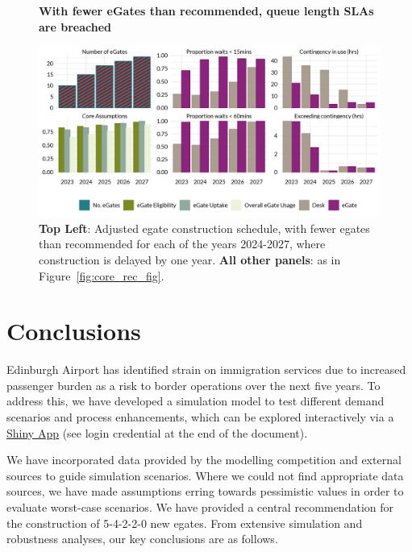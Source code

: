 \documentclass[10pt]{article}
\newcommand*{\figuretitle}[1]{%
    {\centering%
    \textbf{#1}%
    \par\medskip}%
}
\begin{document}
\begin{figure}[!t]
    \centering
    \figuretitle{With fewer eGates than recommended, queue length SLAs are breached}
    \includegraphics[width=\textwidth]{figures/minus_core_rec_fig.png}
     \caption{\textbf{Top Left}: Adjusted \gls{egate} construction schedule, with fewer \glspl{egate} than recommended for each of the years 2024-2027, where construction is delayed by one year. \textbf{All other panels}: as in Figure~\ref{fig:core_rec_fig}.} \label{fig:minus_core_rec_fig}
\end{figure}




\section{Conclusions}
Edinburgh Airport has identified strain on immigration services due to increased passenger burden as a risk to border operations over the next five years. To address this, we have developed a simulation model to test different demand scenarios and process enhancements, which can be explored interactively via a \href{https://jacob-bradley.shinyapps.io/shiny/}{Shiny App} (see login credential at the end of the document). 

We have incorporated data provided by the modelling competition and external sources to guide simulation scenarios. Where we could not find appropriate data sources, we have made assumptions erring towards pessimistic values in order to evaluate worst-case scenarios. We have provided a central recommendation for the construction of 5-4-2-2-0 new \glspl{egate}. From extensive simulation and robustness analyses, our key conclusions are as follows.
\end{document}
